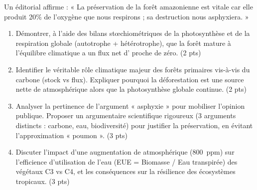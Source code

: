 \documentclass[11pt]{article}
\begin{document}
\begin{exercice}
Un éditorial affirme : « La préservation de la forêt amazonienne est vitale car elle produit 20\% de l'oxygène que nous respirons ; sa destruction nous asphyxiera. »

\begin{enumerate}
    \item Démontrer, à l'aide des bilans stœchiométriques de la photosynthèse et de la respiration globale (autotrophe + hétérotrophe), que la forêt mature à l'équilibre climatique a un flux net d' proche de zéro. (2 pts)
    \item Identifier le véritable rôle climatique majeur des forêts primaires vis-à-vis du carbone (stock vs flux). Expliquer pourquoi la déforestation est une source nette de  atmosphérique alors que la photosynthèse globale continue. (2 pts)
    \item Analyser la pertinence de l'argument « asphyxie » pour mobiliser l'opinion publique. Proposer un argumentaire scientifique rigoureux (3 arguments distincts : carbone, eau, biodiversité) pour justifier la préservation, en évitant l'approximation « poumon ». (3 pts)
    \item Discuter l'impact d'une augmentation de  atmosphérique (\qty{800}{ppm}) sur l'efficience d'utilisation de l'eau (EUE = Biomasse / Eau transpirée) des végétaux C3 vs C4, et les conséquences sur la résilience des écosystèmes tropicaux. (3 pts)
\end{enumerate}
\end{exercice}
\end{document}
